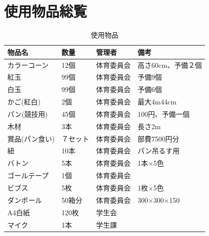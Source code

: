\documentclass[titlepage]{jarticle}
\begin{document}
 \section{使用物品総覧}
\begin{table}[H]
\centering
\caption{使用物品}
\begin{tabular}{llll}
     物品名&数量&管理者&備考\\ \hline\hline
カラーコーン   & 12個  & 体育委員会 & 高さ60cm、予備２個 \\
紅玉       & 99個  & 体育委員会 & 予備9個        \\
白玉       & 99個  & 体育委員会 & 予備6個        \\
かご(紅白)   & 2個   & 体育委員会 & 最大4m44cm    \\
パン(競技用)  & 45個  & 体育委員会 & 100円、予備一個   \\
木材       & 3本   & 体育委員会 & 長さ2m        \\
賞品(パン食い) & ７セット & 体育委員会 & 部費7500円分    \\
紐        & 10本  & 体育委員会 & パン吊るす用      \\
バトン      & 5本   & 体育委員会 & 1本×5色       \\
ゴールテープ   & 1個   & 体育委員会 &             \\
ビブス      & 5枚   & 体育委員会 & 1枚×5色       \\
ダンボール    & 50箱分 & 体育委員会 & 300×300×150 \\
A4白紙     & 120枚 & 学生会   &             \\
マイク      & 1本   & 学生課   &            
\end{tabular}
\end{table}
\end{document}
